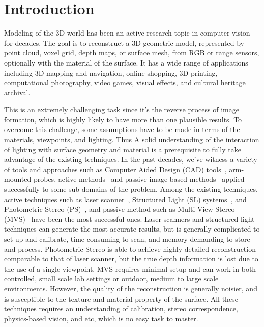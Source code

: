 
\chapter{Introduction}
\label{ch:Introduction}
Modeling of the 3D world has been an active research topic in computer vision for decades. The goal is to reconstruct a 3D geometric model, represented by point cloud, voxel grid, depth maps, or surface mesh, from RGB or range sensors, optionally with the material of the surface. It has a wide range of applications including 3D mapping and navigation, online shopping, 3D printing, computational photography, video games, visual effects, and cultural heritage archival.

This is an extremely challenging task since it's the reverse process of image formation, which is highly likely to have more than one plausible results. To overcome this challenge, some assumptions have to be made in terms of the materials, viewpoints, and lighting. Thus A solid understanding of the interaction of lighting with surface geometry and material is a prerequisite to fully take advantage of the existing techniques. In the past decades, we've witness a variety of tools and approaches such as Computer Aided Design (CAD) tools~\cite{CAD}, arm-mounted probes, active methods~\cite{bernardini2002building,levoy2000digital,Lidar,kinect} and passive image-based methods~\cite{kutulakos2000theory,furukawa2010accurate,faugeras2002variational,goesele2006multi} applied successfully to some sub-domains of the problem. Among the existing techniques, active techniques such as laser scanner~\cite{levoy2000digital}, Structured Light (SL) systems~\cite{bernardini2002building}, and Photometric Stereo (PS)~\cite{woodham1980photometric}, and passive method such as Multi-View Stereo (MVS)~\cite{seitz2006comparison} have been the most successful ones. Laser scanners and structured light techniques can generate the most accurate results, but is generally complicated to set up and calibrate, time consuming to scan, and memory demanding to store and process. Photometric Stereo is able to achieve highly detailed reconstruction comparable to that of laser scanner, but the true depth information is lost due to the use of a single viewpoint. MVS requires minimal setup and can work in both controlled, small scale lab settings or outdoor, medium to large scale environments. However, the quality of the reconstruction is generally noisier, and is susceptible to the texture and material property of the surface. All these techniques requires an understanding of calibration, stereo correspondence, physics-based vision, and etc, which is no easy task to master.

